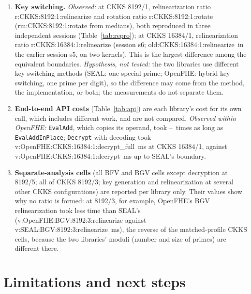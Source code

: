 \documentclass[11pt]{article}
\newcommand{\R}[1]{\csname r:#1\endcsname}   %
\newcommand{\V}[1]{\csname v:#1\endcsname}   %
\newcommand{\RM}[1]{\csname rm:#1\endcsname} %
\begin{document}
\begin{enumerate}[leftmargin=*, itemsep=3pt]
  \item \textbf{Key switching.} \emph{Observed:} at CKKS 8192/1, relinearization ratio \R{CKKS:8192:1:relinearize} and rotation ratio \R{CKKS:8192:1:rotate} (\RM{CKKS:8192:1:rotate} from medians), both reproduced in three independent sessions (Table~\ref{tab:repro}); at CKKS 16384/1, relinearization ratio \R{CKKS:16384:1:relinearize} (session s6; \csname old:CKKS:16384:1:relinearize\endcsname\ in the earlier session s5, on two kernels). This is the largest difference among the equivalent boundaries. \emph{Hypothesis, not tested:} the two libraries use different key-switching methods (SEAL: one special prime; OpenFHE: hybrid key switching, one prime per digit), so the difference may come from the method, the implementation, or both; the measurements do not separate them.
  \item \textbf{End-to-end API costs} (Table~\ref{tab:api}) are each library's cost for its own call, which includes different work, and are not compared. \emph{Observed within OpenFHE:} \texttt{EvalAdd}, which copies its operand, took \copyMin--\copyMax\ times as long as \texttt{EvalAddInPlace}; \texttt{Decrypt} with decoding took \V{OpenFHE:CKKS:16384:1:decrypt_full}~ms at CKKS 16384/1, against \V{OpenFHE:CKKS:16384:1:decrypt}~ms up to SEAL's boundary.
  \item \textbf{Separate-analysis cells} (all BFV and BGV cells except decryption at 8192/5; all of CKKS 8192/3; key generation and relinearization at several other CKKS configurations) are reported per library only. Their values show why no ratio is formed: at 8192/3, for example, OpenFHE's BGV relinearization took less time than SEAL's (\V{OpenFHE:BGV:8192:3:relinearize} against \V{SEAL:BGV:8192:3:relinearize}~ms), the reverse of the matched-profile CKKS cells, because the two libraries' moduli (number and size of primes) are different there.
\end{enumerate}

\section{Limitations and next steps}
\label{sec:limits}
\end{document}
